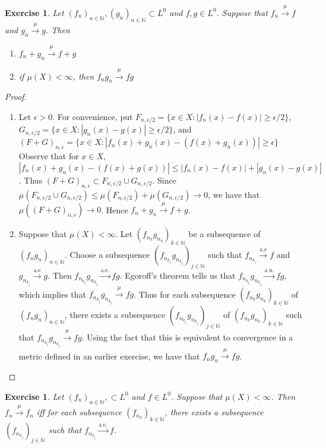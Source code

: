 \documentclass[12pt]{amsart}
\newtheorem{ex}[thm]{Exercise}
\newcommand{\ep}{\epsilon}
\newcommand{\N}{\mathbb{N}}
\newcommand{\convt}[1]{\xrightarrow{\text{#1}}}
\newcommand{\conv}[1]{\xrightarrow{#1}}
\begin{document}
	\begin{ex}
		Let $(f_n)_{n \in \N}, (g_n)_{n \in \N} \subset L^0$ and $f,g \in L^0$. Suppose that $f_n \conv{\mu} f$ and $g_n \conv{\mu}g$. Then 
		\begin{enumerate}
			\item $f_n + g_n \conv{\mu} f+g$
			\item if $\mu(X) < \infty$, then $f_n g_n \conv{\mu} fg$
		\end{enumerate}
	\end{ex}
	
	\begin{proof}
		
		\begin{enumerate}
			\item Let $\ep > 0$. For convenience, put $F_{n,\ep/2} = \{x \in X: |f_n(x) - f(x)| \geq \ep/2\}$, $G_{n, \ep/2} = \{x \in X: |g_n(x) - g(x)| \geq \ep/2\}$, and $(F+G)_{n,\ep} = \{x \in X: |f_n(x)+g_n(x) - (f(x) + g_n(x))| \geq \ep\}$ Observe that for $x \in X$, $|f_n(x) + g_n(x) - (f(x) + g(x))| \leq |f_n(x) - f(x)| + |g_n(x) - g(x)|$. Thus $(F+G)_{n,\ep} \subset F_{n,\ep/2} \cup G_{n, \ep/2}$. Since $\mu(F_{n,\ep/2} \cup G_{n, \ep/2}) \leq \mu(F_{n,\ep/2}) + \mu(G_{n, \ep/2}) \rightarrow 0$, we have that $\mu((F+G)_{n,\ep}) \rightarrow 0$. Hence $f_n + g_n \conv{\mu} f+g$.
			
			\item Suppose that $\mu(X) < \infty$. Let $(f_{n_k}g_{n_k})_{k \in \N}$ be a subsequence of $(f_ng_n)_{n \in \N}$. Choose a subsequence $(f_{n_{k_j}}g_{n_{k_j}})_{j \in \N}$ such that $f_{n_{k_j}} \convt{a.e} f$ and $g_{n_{k_j}} \convt{a.e} g$. Then $f_{n_{k_j}}g_{n_{k_j}} \convt{a.e.} fg$. Egoroff's theorem tells us that $f_{n_{k_j}}g_{n_{k_j}} \convt{a.u.} fg$, which implies that $f_{n_{k_j}}g_{n_{k_j}} \conv{\mu} fg$. Thus for each subsequence $(f_{n_k}g_{n_k})_{k \in \N}$ of $(f_ng_n)_{n \in \N}$, there exists a subsequence $(f_{n_{k_j}}g_{n_{k_j}})_{j \in \N}$ of $(f_{n_k}g_{n_k})_{k \in \N}$ such that $f_{n_{k_j}}g_{n_{k_j}} \conv{\mu} fg$. Using the fact that this is equivalent to convergence in a metric defined in an earlier exercise,
			we have that $f_ng_n \conv{\mu} fg$.
		\end{enumerate}
		
	\end{proof}
	
	\begin{ex}
		Let $(f_n)_{n \in \N}, \subset L^0$ and $f \in L^0$. Suppose that $\mu(X) < \infty$. Then $f_n \conv{\mu}f_n$ iff for each subsequence $(f_{n_k})_{k \in \N}$, there exists a subsequence $(f_{n_{k_j}})_{j \in \N}$ such that $f_{n_{k_j}} \convt{a.e.} f$.
	\end{ex}
	
\end{document}
